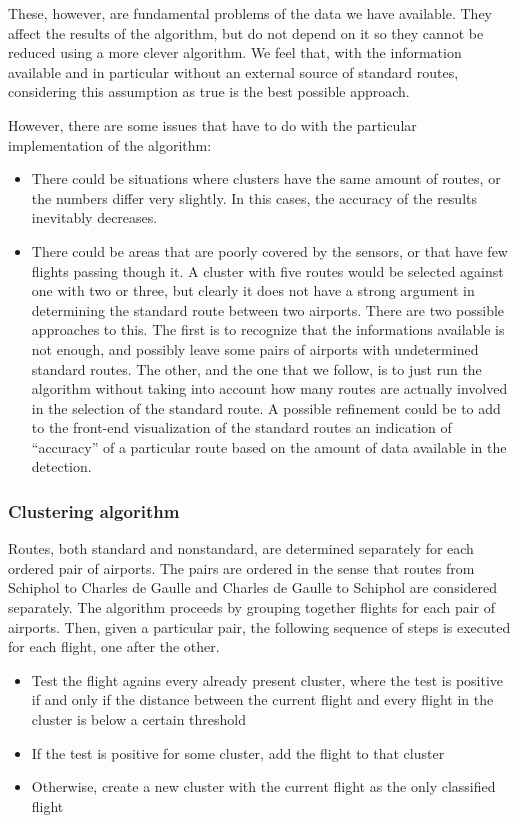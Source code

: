 \documentclass{vldb}
\begin{document}
These, however, are fundamental problems of the data we have available. They
affect the results of the algorithm, but do not depend on it so they cannot be
reduced using a more clever algorithm. We feel that, with the information
available and in particular without an external source
of standard routes, considering this assumption as true is the best
possible approach.

However, there are some issues that have to do with the particular
implementation of the algorithm:

\begin{itemize}
  \item There could be situations where clusters have the same amount of routes,
  or the numbers differ very slightly. In this cases, the accuracy of the
  results inevitably decreases.
  \item There could be areas that are poorly covered by the sensors, or that
  have few flights passing though it. A cluster with five routes would be
  selected against one with two or three, but clearly it does not have a strong
  argument in determining the standard route between two airports. There are two
  possible approaches to this. The first is to recognize that the informations
  available is not enough, and possibly leave some pairs of airports with
  undetermined standard routes. The other, and the one that we follow, is to
  just run the algorithm without taking into account how many routes are
  actually involved in the selection of the standard route. A possible
  refinement could be to add to the front-end visualization of the standard
  routes an indication of ``accuracy'' of a particular route based on the amount
  of data available in the detection.
\end{itemize}

\subsubsection{Clustering algorithm}

Routes, both standard and nonstandard, are determined separately for each
ordered pair of airports. The pairs are ordered in the sense that routes from
Schiphol to Charles de Gaulle and Charles de Gaulle to Schiphol are considered
separately. The algorithm proceeds by grouping together flights for each pair of
airports. Then, given a particular pair, the following sequence of steps is
executed for each flight, one after the other.

\begin{itemize}
  \item Test the flight agains every already present cluster, where the test is
  positive if and only if the distance between the current flight and every
  flight in the cluster is below a certain threshold
  \item If the test is positive for some cluster, add the flight to that cluster
  \item Otherwise, create a new cluster with the current flight as the only
  classified flight
\end{itemize}
\end{document}
